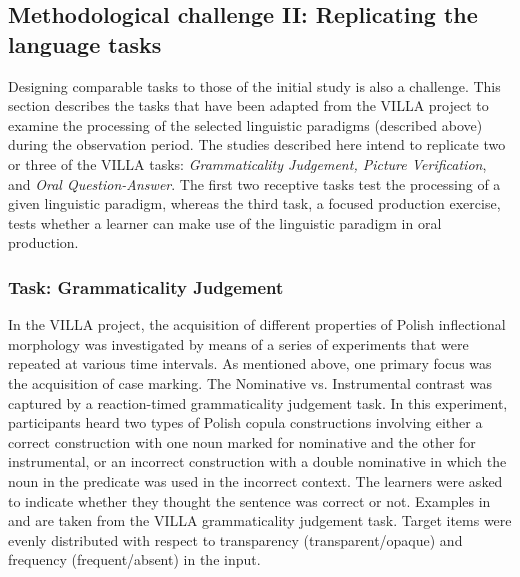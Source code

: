 \documentclass[output=paper,colorlinks,citecolor=brown,modfonts,nonflat]{../langscibook}
\begin{document}
\subsection{Methodological challenge II: Replicating the language tasks}\label{sec:watorek:4.2}

Designing comparable tasks to those of the initial study is also a challenge. This section describes the tasks that have been adapted from the VILLA project to examine the processing of the selected linguistic paradigms (described above) during the observation period. The studies described here intend to replicate two or three of the VILLA tasks: \textit{Grammaticality Judgement, Picture Verification}, and \textit{Oral Question-Answer}. The first two receptive tasks test the processing of a given linguistic paradigm, whereas the third task, a focused production exercise, tests whether a learner can make use of the linguistic paradigm in oral production.

\subsubsection{Task: Grammaticality Judgement}

In the VILLA project, the acquisition of different properties of Polish inflectional morphology was investigated by means of a series of experiments that were repeated at various time intervals. As mentioned above, one primary focus was the acquisition of case marking. The Nominative vs. Instrumental contrast was captured by a reaction-timed grammaticality judgement task. In this experiment, participants heard two types of Polish copula constructions involving either a correct construction with one noun marked for nominative and the other for instrumental, or an incorrect construction with a double nominative in which the noun in the predicate was used in the incorrect context. The learners were asked to indicate whether they thought the sentence was correct or not. Examples in  and  are taken from the VILLA grammaticality judgement task. Target items were evenly distributed with respect to transparency (transparent/opaque) and frequency (frequent/absent) in the input.
\end{document}
